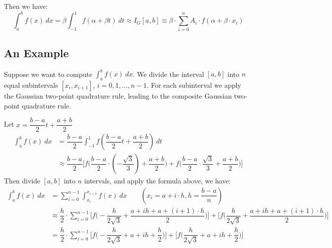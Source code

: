 \documentclass [9 pt]{article}
\theoremstyle{definition}
\begin{document}
Then we have:
$$ \int_a^b f(x) \ dx = \beta \int_{-1}^{1} f(\alpha + \beta t)\ dt  \approx I_G[a, b] \equiv \beta \cdot \sum_{i = 0}^n A_i \cdot f(\alpha + \beta\cdot x_i)$$

\subsection*{An Example}
Suppose we want to compute $ \int_a^b f (x)\ dx$. We divide the interval $[a, b]$ into $n$ equal  subintervals $ [x_i, x_{i+1}]$, $i = 0, 1, \ldots , n- 1$. For each subinterval we apply the Gaussian two-point quadrature rule, leading to the composite Gaussian two-point quadrature rule.

\begin{mdframed}
	Let $x = \dfrac{b - a}{2} t + \dfrac{a + b}{2}$\\
	\begin{align*}
		\int_{a}^b f(x)\ dx 
		&= \dfrac{b - a}{2} \int_{-1}^1 f(\dfrac{b - a}{2}t + \dfrac{a + b}{2})\ dt \\
		&\approx \dfrac{b - a}{2} \bigg[ f\Big(\dfrac{b - a}{2} \cdot (- \dfrac{\sqrt{3}}{3}) + \dfrac{a + b}{2} \Big) + f\Big(\dfrac{b - a}{2} \cdot \dfrac{\sqrt{3}}{3}  + \dfrac{a + b}{2} \Big) \bigg]
	\end{align*}
	Then divide $[a, b]$ into $n$ intervals, and apply the formula above, we have:
	\begin{align*}
		\int_{a}^b f(x)\ dx 
		&= \sum_{i = 0}^{n - 1} \int_{x_i}^{x_{i+1}} f(x)\ dx \quad\quad (x_i = a + i\cdot h, h = \dfrac{b - a}{n})\\
		&\approx \dfrac{h}{2} \cdot  \sum_{i = 0}^{n - 1} \Bigg[ f\Big( -\dfrac{h}{2 \sqrt{3}} + \dfrac{a + ih + a + (i+1)\cdot h}{2} \Big) \Bigg] + \Bigg[ f\Big( \dfrac{h}{2 \sqrt{3}} + \dfrac{a + ih + a + (i+1)\cdot h}{2} \Big) \Bigg]\\
		&= \dfrac{h}{2} \cdot  \sum_{i = 0}^{n - 1} \Bigg[ f\Big( -\dfrac{h}{2 \sqrt{3}} + a + ih + \dfrac{h}{2} \Big) \Bigg] + \Bigg[ f\Big( \dfrac{h}{2 \sqrt{3}} + a + ih + \dfrac{h}{2} \Big) \Bigg]\\
	\end{align*}
\end{mdframed}
\end{document}
